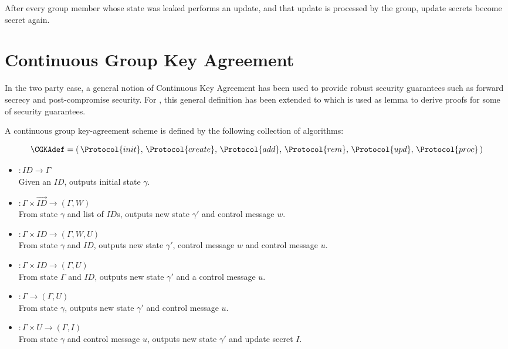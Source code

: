 \begin{definition}
After every group member whose state was leaked performs an update, and that update is processed by the group, update secrets become secret again.
\end{definition}


\hypertarget{sec:CGKA}{%
\section{Continuous Group Key Agreement}\label{sec:CGKA}}

In the two party case, a general notion of Continuous Key Agreement \autocite{alwen2019double} has been used to provide robust security guarantees such as forward secrecy and post-compromise security.
For , this general definition has been extended to  \autocite{alwen2020security} which is used as lemma to derive proofs for some of  security guarantees.

A continuous group key-agreement scheme is defined by the following collection of algorithms:

\[ \CGKAdef = (\,\Protocol{init},\, \Protocol{create},\, \Protocol{add},\, \Protocol{rem},\, \Protocol{upd},\, \Protocol{proc}\,) \]

\begin{itemize}
\item {}   \(: ID \to \Gamma\)\\
  Given an \(ID\), outputs initial state \(\gamma\).
\item {} \(: \Gamma \times \overrightarrow{ID} \to (\Gamma, W)\)\\
  From state \(\gamma\) and list of \(ID\)s, outputs new state \(\gamma'\) and control message \(w\).
\item {}    \(: \Gamma \times ID \to (\Gamma, W, U)\)\\
  From state \(\gamma\) and \(ID\), outputs new state \(\gamma'\), control message \(w\) and control message \(u\).
\item {}    \(: \Gamma \times ID \to (\Gamma, U)\)\\
  From state \(\Gamma\) and \(ID\), outputs new state \(\gamma'\) and a control message \(u\).
\item {}    \(: \Gamma \to (\Gamma, U)\)\\
  From state \(\gamma\), outputs new state \(\gamma'\) and control message \(u\).
\item {}   \(: \Gamma \times U \to (\Gamma, I)\)\\
  From state \(\gamma\) and control message \(u\), outputs new state \(\gamma'\) and update secret \(I\).
\end{itemize}

